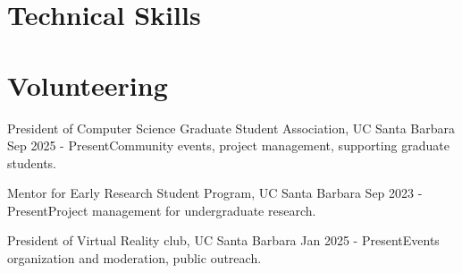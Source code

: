\documentclass{scv}
\begin{document}
\section{Technical Skills}
\resumeSkillListStart
\resumeSkillListEnd

\section{Volunteering}
  \resumeSubHeadingListStart

  \resumeItemWithText
  {President of Computer Science Graduate Student Association, UC Santa Barbara}
  {Sep 2025 - Present}{Community events, project management, supporting graduate students.}

  \resumeItemWithText
  {Mentor for Early Research Student Program, UC Santa Barbara}
  {Sep 2023 - Present}{Project management for undergraduate research.}
  
  \resumeItemWithText
  {President of Virtual Reality club, UC Santa Barbara}
  {Jan 2025 - Present}{Events organization and moderation, public outreach.}



  \resumeSubHeadingListEnd
\end{document}
